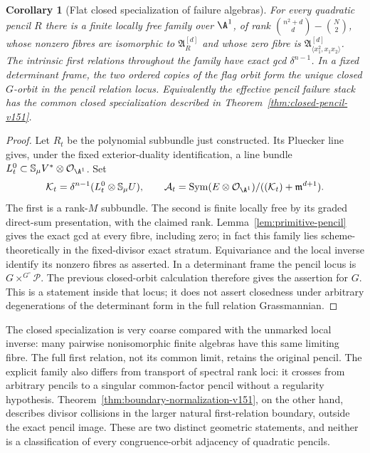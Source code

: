 \documentclass[11pt,reqno]{amsart}
\numberwithin{equation}{section}
\newtheorem{corollary}[theorem]{Corollary}
\theoremstyle{definition}\newtheorem{definition}[theorem]{Definition}
\theoremstyle{remark}\newtheorem{remark}[theorem]{Remark}
\newcommand{\OO}{\mathcal O}\newcommand{\II}{\mathcal I}
\DeclareMathOperator{\Sym}{Sym}\DeclareMathOperator{\Gr}{Gr}
\begin{document}
\begin{corollary}[Flat closed specialization of failure algebras]
\label{cor:closed-failure-v151}
For every quadratic pencil \(R\) there is a finite locally free
family over \(\A^1\), of rank
\(\binom{n^2+d}{d}-\binom N2\), whose nonzero fibres are isomorphic
to \(\mathfrak A_R^{[d]}\) and whose zero fibre is
\(\mathfrak A_{\langle x_1^2,x_1x_2\rangle}^{[d]}\).
The intrinsic first relations throughout the family have exact gcd
\(\delta^{n-1}\).  In a fixed determinant frame, the two ordered
copies of the flag orbit form the unique closed \(G\)-orbit in the
pencil relation locus.  Equivalently the effective pencil failure
stack has the common closed specialization described in
Theorem~\ref{thm:closed-pencil-v151}.
\end{corollary}
\begin{proof}
Let \(R_t\) be the polynomial subbundle just constructed.  Its
Pluecker line gives, under the fixed exterior-duality identification,
a line bundle \(L_t^0\subset\mathbb S_\mu V^*\otimes\OO_{\A^1}\).
Set
\[
 \mathcal K_t=\delta^{n-1}(L_t^0\otimes\mathbb S_\mu U),\qquad
 \mathcal A_t=\Sym(E\otimes\OO_{\A^1})/
                       ((\mathcal K_t)+\mathfrak m^{d+1}).
\]
The first is a rank-\(M\) subbundle.  The second is finite locally
free by its graded direct-sum presentation, with the claimed rank.
Lemma~\ref{lem:primitive-pencil} gives the exact gcd at every fibre,
including zero; in fact this family lies scheme-theoretically in the
fixed-divisor exact stratum.  Equivariance and the local inverse
identify its nonzero fibres as asserted.  In a determinant frame the
pencil locus is \(G\times^{G^\circ}\mathscr P\).  The previous
closed-orbit calculation therefore gives the assertion for \(G\).
This is a statement inside that locus; it does not assert closedness
under arbitrary degenerations of the determinant form in the full
relation Grassmannian.
\end{proof}

The closed specialization is very coarse compared with the unmarked
local inverse: many pairwise nonisomorphic finite algebras have this
same limiting fibre.  The full first relation, not its common limit,
retains the original pencil.  The explicit family also differs from
transport of spectral rank loci: it crosses from arbitrary pencils to
a singular common-factor pencil without a regularity hypothesis.
Theorem~\ref{thm:boundary-normalization-v151}, on the other hand,
describes divisor collisions in the larger natural first-relation
boundary, outside the exact pencil image.  These are two distinct
geometric statements, and neither is a classification of every
congruence-orbit adjacency of quadratic pencils.
\end{document}
